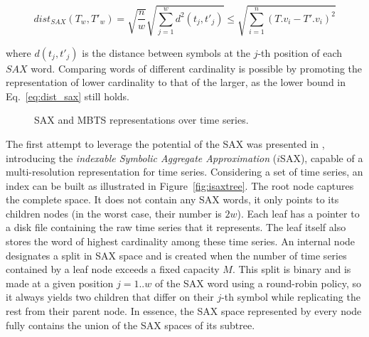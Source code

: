 \begin{equation} \label{eq:dist_sax}
dist_{SAX}(T_w, T'_w) =\sqrt{\frac{n}{w}} \sqrt{\sum_{j=1}^{w} d^2(t_j, t'_j) }  \leq {\sqrt{\displaystyle \sum_{i=1}^{n}(T.v_i - T'.v_i)^2}}
\end{equation}

\noindent where $d(t_j, t'_j)$ is the distance between symbols at the $j$-th position of each $SAX$ word. Comparing \isax words of different cardinality is possible by promoting the \isax representation of lower cardinality to that of the larger, as the lower bound in Eq.~\ref{eq:dist_sax} still holds.

\begin{figure}[tb]
 \centering
 \qquad
\caption{SAX and MBTS representations over time series.}
\label{fig:isax_example}
\end{figure}

The first attempt to leverage the potential of the SAX was presented in \cite{shieh2008kdd}, introducing the \textit{indexable Symbolic Aggregate Approximation} ($i$SAX), capable of a multi-resolution representation for time series. Considering a set of time series, an \isax index \cite{shieh2008kdd} can be built as illustrated in Figure~\ref{fig:isaxtree}. The root node captures the complete \isax space. It does not contain any SAX words, it only points to its children nodes (in the worst case, their number is $2w$). Each leaf has a pointer to a disk file containing the raw time series that it represents. The leaf itself also stores the \isax word of highest cardinality among these time series. An internal node designates a split in SAX space and is created when the number of time series contained by a leaf node exceeds a fixed capacity $M$. This split is binary and is made at a given position $j=1..w$ of the SAX word using a round-robin policy, so it always yields two children that differ on their $j$-th symbol while replicating the rest from their parent node. In essence, the SAX space represented by every node fully contains the union of the SAX spaces of its subtree.

